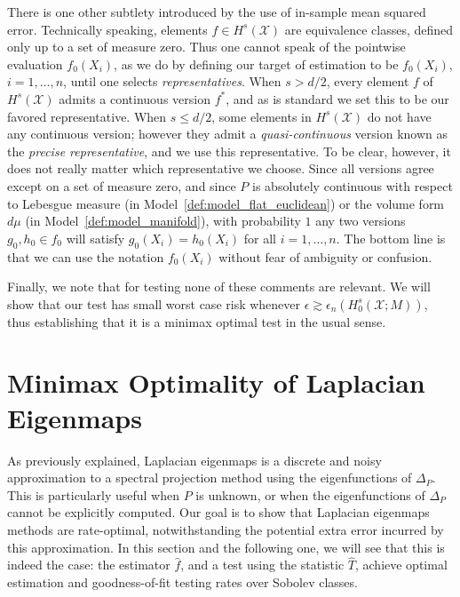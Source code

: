 \documentclass{article}
\newcommand{\1}{\mathbf{1}}
\newcommand{\mc}[1]{\mathcal{#1}}
\newcommand{\wh}[1]{\widehat{#1}}
\theoremstyle{alden}
\theoremstyle{aldenthm}
\theoremstyle{definition}
\theoremstyle{remark}
\begin{document}
There is one other subtlety introduced by the use of in-sample mean squared error. Technically speaking, elements $f \in H^s(\mc{X})$ are equivalence classes, defined only up to a set of measure zero. Thus one cannot speak of the pointwise evaluation $f_0(X_i)$, as we do by defining our target of estimation to be $f_0(X_i)$, $i=1,\ldots,n$, until one selects \emph{representatives}. When $s > d/2$, every element $f$ of $H^s(\mc{X})$ admits a continuous version $f^{\ast}$, and as is standard we set this to be our favored representative. When $s \leq d/2$, some elements in $H^s(\mc{X})$ do not have any continuous version; however they admit a \emph{quasi-continuous} version \citep{evans15} known as the \emph{precise representative}, and we use this representative. To be clear, however, it does not really matter which representative we choose. Since all versions agree except on a set of measure zero, and since $P$ is absolutely continuous with respect to Lebesgue measure (in Model~\ref{def:model_flat_euclidean}) or the volume form $d\mu$ (in Model~\ref{def:model_manifold}), with probability $1$ any two versions $g_0, h_0 \in f_0$ will satisfy $g_0(X_i) = h_0(X_i)$ for all $i = 1,\ldots,n$. The bottom line is that we can use the notation $f_0(X_i)$ without fear of ambiguity or confusion.

Finally, we note that for testing none of these comments are relevant. We will show that our test has small worst case risk whenever $\epsilon \gtrsim \epsilon_n(H_0^s(\mc{X};M))$, thus establishing that it is a minimax optimal test in the usual sense.

\section{Minimax Optimality of Laplacian Eigenmaps}
\label{sec:minimax_optimal_laplacian_eigenmaps}

As previously explained, Laplacian eigenmaps is a discrete and noisy approximation to a spectral projection method using the eigenfunctions of $\Delta_P$. This is particularly useful when $P$ is unknown, or when the eigenfunctions of $\Delta_P$ cannot be explicitly computed. Our goal is to show that Laplacian eigenmaps methods are rate-optimal, notwithstanding the potential extra error incurred by this approximation. In this section and the following one, we will see that this is indeed the case: the estimator $\wh{f}$, and a test using the statistic $\wh{T}$, achieve optimal estimation and goodness-of-fit testing rates over Sobolev classes. 
\end{document}
